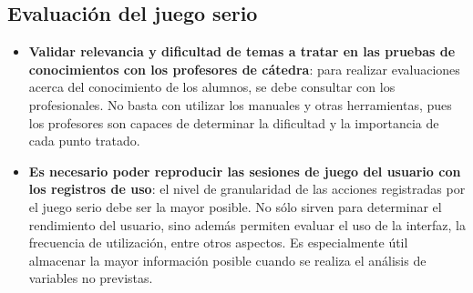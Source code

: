 \subsection{Evaluación del juego serio}


\begin{itemize}

\item \textbf{Validar relevancia y dificultad de temas a tratar en las pruebas de conocimientos con los profesores de cátedra}: para realizar evaluaciones acerca del conocimiento de los alumnos, se debe consultar con los profesionales. No basta con utilizar los manuales y otras herramientas, pues los profesores son capaces de determinar la dificultad y la importancia de cada punto tratado.

\item \textbf{Es necesario poder reproducir las sesiones de juego del usuario con los registros de uso}: el nivel de granularidad de las acciones registradas por el juego serio debe ser la mayor posible. No sólo sirven para determinar el rendimiento del usuario, sino además permiten evaluar el uso de la interfaz, la frecuencia de utilización, entre otros aspectos. Es especialmente útil almacenar la mayor información posible cuando se realiza el análisis de variables no previstas.


\end{itemize}
